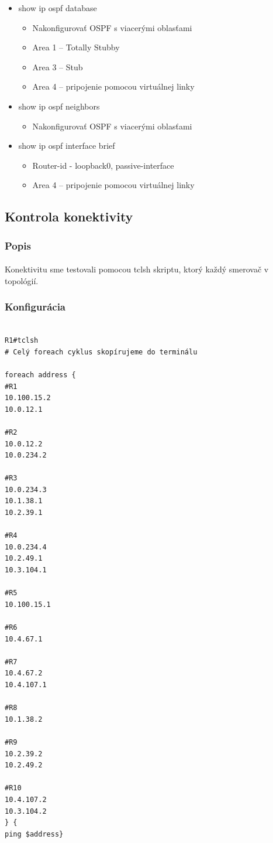\documentclass[12pt,twoside,a4paper]{report}
\begin{document}
\begin{itemize}
\item show ip ospf database
	\begin{itemize}
	\item Nakonfigurovať OSPF s viacerými oblasťami
	\item Area 1 – Totally Stubby
	\item Area 3 – Stub
	\item Area 4 – pripojenie pomocou virtuálnej linky
	\end{itemize}
\item show ip ospf neighbors 
	\begin{itemize}
	\item Nakonfigurovať OSPF s viacerými oblasťami
	\end{itemize}
\item show ip ospf interface brief
	\begin{itemize}
	\item Router-id - loopback0, passive-interface
	\item Area 4 – pripojenie pomocou virtuálnej linky
	\end{itemize}
\end{itemize}


\subsection{Kontrola konektivity}
\subsubsection{Popis}
\paragraph{}
Konektivitu sme testovali pomocou tclsh skriptu, ktorý  každý smerovač v topológií.

\subsubsection{Konfigurácia}

\noindent
{\selectfont
\begin{small}
\begin{verbatim}

R1#tclsh
# Celý foreach cyklus skopírujeme do terminálu

foreach address {
#R1
10.100.15.2
10.0.12.1

#R2
10.0.12.2
10.0.234.2

#R3
10.0.234.3
10.1.38.1
10.2.39.1

#R4
10.0.234.4
10.2.49.1
10.3.104.1

#R5
10.100.15.1

#R6
10.4.67.1

#R7
10.4.67.2
10.4.107.1

#R8
10.1.38.2

#R9
10.2.39.2
10.2.49.2

#R10
10.4.107.2
10.3.104.2
} {
ping $address}

\end{verbatim}
\end{small}
}
\end{document}

